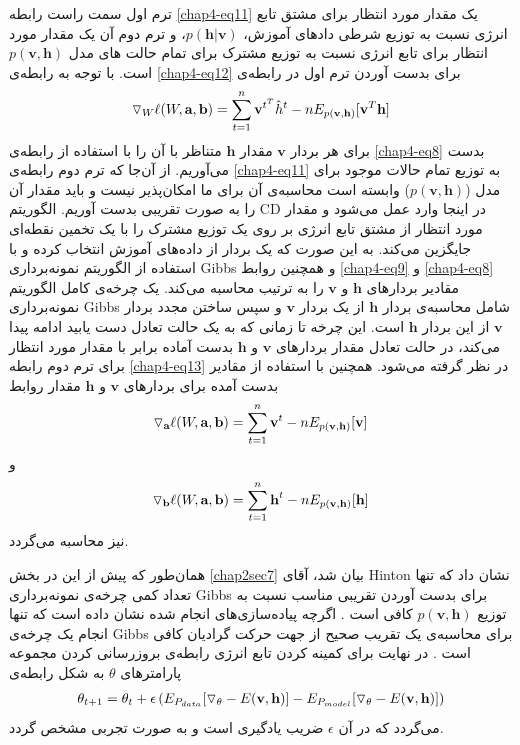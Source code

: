 ترم اول سمت راست رابطه
\ref{chap4-eq11}
یک مقدار مورد انتظار برای مشتق تابع انرژی نسبت به توزیع شرطی دادهای آموزش،
$p(\textbf{h}|\textbf{v})$،
و ترم دوم آن یک مقدار مورد انتظار برای تابع انرژی نسبت به توزیع مشترک برای تمام حالت های  مدل
$p(\textbf{v},\textbf{h})$
 است. با توجه به رابطه‌ی
\ref{chap4-eq12}
برای بدست آوردن ترم اول در رابطه‌ی
\begin{align}
	\centering
	\label{chap4-eq13}
	\triangledown_W \ell(W, \textbf{a}, \textbf{b})=\sum_{t=1}^{n} \textbf{v}^{t^T} \hat{h}^t - nE_{p(\textbf{v},\textbf{h})}[\textbf{v}^T\textbf{h}]
\end{align}
برای هر بردار
$\textbf{v}$
مقدار
$\textbf{h}$
متناظر با آن را با استفاده از رابطه‌ی
\ref{chap4-eq8}
بدست می‌‌آوریم. از آن‌جا که ترم دوم رابطه‌ی
\ref{chap4-eq11}
به توزیع تمام حالات موجود برای مدل
($p(\textbf{v},\textbf{h})$)
وابسته است محاسبه‌ی آن برای ما امکان‌پذیر نیست و باید مقدار آن را به صورت تقریبی بدست آوریم. الگوریتم
CD
در اینجا وارد عمل می‌شود و مقدار مورد انتظار از مشتق تابع انرژی بر روی یک توزیع مشترک را با یک تخمین نقطه‌ای جایگزین می‌‌کند. به این صورت که یک بردار از داده‌های آموزش انتخاب کرده و با استفاده از الگوریتم نمونه‌برداری
Gibbs
و همچنین روابط
\ref{chap4-eq9}
و
\ref{chap4-eq8}
مقادیر بردار‌های
$\textbf{h}$
و
$\textbf{v}$
را به ترتیب محاسبه می‌کند. یک چرخه‌‌ی کامل الگوریتم نمونه‌برداری
Gibbs
شامل محاسبه‌ی بردار
$\textbf{h}$
از یک بردار
$\textbf{v}$
و سپس ساختن مجدد بردار
$\textbf{v}$
از این بردار
$\textbf{h}$
است. این چرخه تا زمانی که به یک حالت تعادل دست یابید ادامه پیدا می‌کند، در حالت تعادل مقدار بردارهای
$\textbf{v}$
و
$\textbf{h}$
بدست آماده برابر با مقدار مورد انتظار برای ترم دوم رابطه
\ref{chap4-eq13}
در نظر گرفته می‌‌شود. همچنین با استفاده از مقادیر بدست آمده برای بردارهای
$\textbf{v}$
و
$\textbf{h}$
مقدار روابط
\begin{align}
	\centering
	\label{chap4-eq14}
	\triangledown_{\textbf{a}} \ell(W, \textbf{a}, \textbf{b})=\sum_{t=1}^{n} \textbf{v}^{t} - nE_{p(\textbf{v},\textbf{h})}[\textbf{v}] 
\end{align}
و
\begin{align}
	\centering
	\label{chap4-eq15}
	\triangledown_{\textbf{b}} \ell(W, \textbf{a}, \textbf{b})=\sum_{t=1}^{n} \textbf{h}^{t} - nE_{p(\textbf{v},\textbf{h})}[\textbf{h}] 
\end{align}
نیز محاسبه می‌‌گردد.

همان‌طور که پیش از این در بخش
\ref{chap2sec7}
بیان شد، آقای
Hinton
نشان داد که تنها تعداد کمی‌ چرخه‌‌‌ی نمونه‌برداری
Gibbs
برای بدست آوردن تقریبی مناسب نسبت به توزیع
$p(\textbf{v},\textbf{h})$
کافی‌ است
\cite{hinton2002training}\cite{carreira2005contrastive}.
اگرچه پیاده‌سازی‌های انجام شده نشان داده است که تنها انجام یک چرخه‌ی
Gibbs
برای محاسبه‌ی یک تقریب صحیح از جهت حرکت گرادیان کافی‌ است
\cite{carreira2005contrastive}.
در نهایت برای کمینه کردن تابع انرژی رابطه‌ی بروز‌رسانی کردن مجموعه پارامتر‌های 
$\theta$
 به شکل رابطه‌ی
\begin{align}
	\centering
	\label{chap4-eq16}
	\theta_{t+1} = \theta_t + \epsilon \left( E_{P_{data}}[\triangledown_{\theta} -E(\textbf{v},\textbf{h})] - E_{P_{model}}[\triangledown_{\theta} -E(\textbf{v},\textbf{h})] \right) 
\end{align}
می‌گردد که در آن
$\epsilon$
ضریب یادگیری است و به صورت تجربی‌ مشخص گردد.


